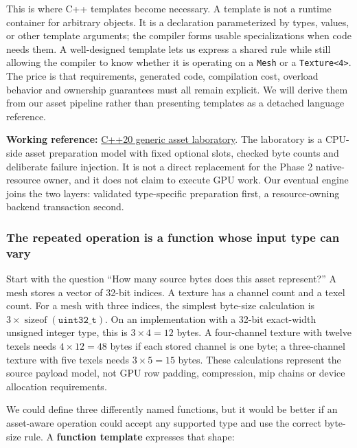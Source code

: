 This is where C++ templates become necessary. A template is not a runtime container for arbitrary objects. It is a declaration parameterized by types, values, or other template arguments; the compiler forms usable specializations when code needs them. A well-designed template lets us express a shared rule while still allowing the compiler to know whether it is operating on a \texttt{Mesh} or a \texttt{Texture\textless{}4\textgreater{}}. The price is that requirements, generated code, compilation cost, overload behavior and ownership guarantees must all remain explicit. We will derive them from our asset pipeline rather than presenting templates as a detached language reference.

\textbf{Working reference:} \href{tools/labs/generic_asset_pipeline_lab.cpp}{C++20 generic asset laboratory}. The laboratory is a CPU-side asset preparation model with fixed optional slots, checked byte counts and deliberate failure injection. It is not a direct replacement for the Phase 2 native-resource owner, and it does not claim to execute GPU work. Our eventual engine joins the two layers: validated type-specific preparation first, a resource-owning backend transaction second.

\subsubsection{The repeated operation is a function whose input type can vary}\label{the-repeated-operation-is-a-function-whose-input-type-can-vary}

Start with the question ``How many source bytes does this asset represent?'' A mesh stores a vector of 32-bit indices. A texture has a channel count and a texel count. For a mesh with three indices, the simplest byte-size calculation is \(3\times\operatorname{sizeof}(\texttt{uint32\_t})\). On an implementation with a 32-bit exact-width unsigned integer type, this is \(3\times4=12\) bytes. A four-channel texture with twelve texels needs \(4\times12=48\) bytes if each stored channel is one byte; a three-channel texture with five texels needs \(3\times5=15\) bytes. These calculations represent the source payload model, not GPU row padding, compression, mip chains or device allocation requirements.

We could define three differently named functions, but it would be better if an asset-aware operation could accept any supported type and use the correct byte-size rule. A \textbf{function template} expresses that shape:

